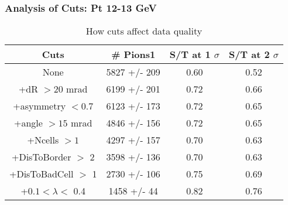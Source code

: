 \frame
{
\frametitle{Analysis of Cuts: Pt 12-13 GeV}
\begin{table}
\caption{How cuts affect data quality}
\centering
\begin{tabular}{c c c c}
\hline\hline
Cuts & \# Pions1 & S/T at 1 $\sigma$ & S/T at 2 $\sigma$ \\ [0.5ex]
\hline
None & 5827 +/-  209 & 0.60 & 0.52 \\ %
+dR $> 20$ mrad & 6199 +/-  201 & 0.72 & 0.66 \\ %
+asymmetry $< 0.7$ & 6123 +/-  173 & 0.72 & 0.65 \\ %
+angle $> 15$ mrad & 4846 +/-  156 & 0.72 & 0.65 \\ %
+Ncells $> 1$& 4297 +/-  157 & 0.70 & 0.63 \\ %
+DisToBorder $>$ 2 & 3598 +/-  136 & 0.70 & 0.63 \\ %
+DisToBadCell $>$ 1& 2730 +/-  106 & 0.75 & 0.69 \\ %
+$0.1 < \lambda <$ 0.4 & 1458 +/-   44 & 0.82 & 0.76 \\ %
[1ex]
\hline
\end{tabular}
\label{table:nonlin}
\end{table}
}
